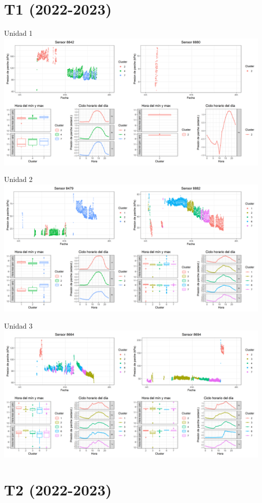 \documentclass[
  letterpaper,
  DIV=11,
  numbers=noendperiod]{scrreprt}
\begin{document}
\chapter{T1 (2022-2023)}

Unidad 1
\includegraphics{figuras/02_turgor_limpiado/2022_2023_Rio_Claro_T1_Unidad_1.png}

Unidad 2
\includegraphics{figuras/02_turgor_limpiado/2022_2023_Rio_Claro_T1_Unidad_2.png}

Unidad 3
\includegraphics{figuras/02_turgor_limpiado/2022_2023_Rio_Claro_T1_Unidad_3.png}

\chapter{T2 (2022-2023)}
\end{document}
